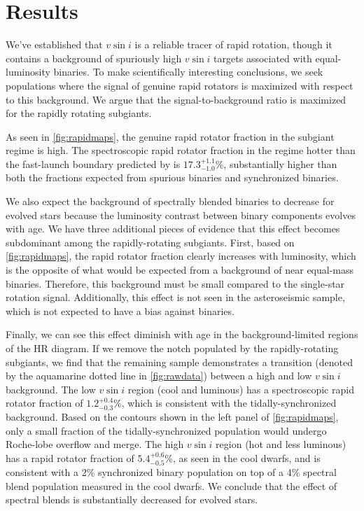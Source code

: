 \documentclass[preprint2]{aastex62}
\newcommand{\vsini}{\ensuremath{v \sin i}}
\begin{document}
\section{Results}
\label{sec:results}

We've established that \vsini{} is a reliable tracer of rapid rotation, though
it contains a background of spuriously high \vsini{} targets associated with 
equal-luminosity binaries. To make scientifically interesting conclusions, we
seek populations where the signal of genuine rapid rotators is maximized with 
respect to this background. We argue
that the signal-to-background ratio is maximized for the rapidly rotating
subgiants.

As seen in \cref{fig:rapidmaps}, the genuine rapid rotator fraction in the
subgiant regime is high. The spectroscopic rapid rotator fraction in the regime
hotter than the fast-launch boundary predicted by \citet{vanSaders13}
is \(17.3^{+1.1}_{-1.0}\)\%, substantially higher than both the fractions
expected from spurious binaries and synchronized binaries. 

We also expect the background of
spectrally blended binaries to decrease for evolved stars because the 
luminosity contrast between binary components evolves with age. We have
three additional pieces of evidence that this effect becomes subdominant among 
the rapidly-rotating subgiants. First, based on \cref{fig:rapidmaps}, the rapid
rotator fraction clearly increases with luminosity, which is the opposite of
what would be expected from a background of near equal-mass binaries. 
Therefore, this background
must be small compared to the single-star rotation signal. Additionally, this
effect is not seen in the asteroseismic sample, which is not expected to have a
bias against binaries. 

Finally, we can see this effect diminish with age in the
background-limited regions of the HR diagram. If we remove the notch populated
by the rapidly-rotating subgiants, we find that the remaining sample 
demonstrates a transition (denoted by the aquamarine dotted line in
\cref{fig:rawdata}) between a high and low 
\vsini{} background. The low \vsini{} region (cool and luminous) has a
spectroscopic rapid rotator fraction of \(1.2^{+0.4}_{-0.3}\%\), which is 
consistent with the tidally-synchronized background. Based on the contours
shown in the left panel of \cref{fig:rapidmaps}, only a small fraction of the
tidally-synchronized population would undergo Roche-lobe overflow and merge. 
The high \vsini{} region (hot and less luminous) has a rapid rotator fraction 
of \(5.4^{+0.6}_{-0.5}\%\), as seen in the cool dwarfs, and is consistent with 
a 2\% synchronized binary population on top of a 4\% spectral blend population
measured in the cool dwarfs. We conclude that the effect of 
spectral blends is substantially decreased for evolved stars.
\end{document}
